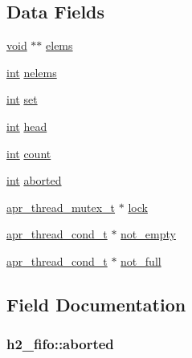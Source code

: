 \subsection*{Data Fields}
\begin{DoxyCompactItemize}
\item 
\hyperlink{group__MOD__ISAPI_gacd6cdbf73df3d9eed42fa493d9b621a6}{void} $\ast$$\ast$ \hyperlink{structh2__fifo_acc4bdceeab41c47735c7fa63b454cf70}{elems}
\item 
\hyperlink{pcre_8txt_a42dfa4ff673c82d8efe7144098fbc198}{int} \hyperlink{structh2__fifo_aad0836dd046d88fa564a96cd351178a0}{nelems}
\item 
\hyperlink{pcre_8txt_a42dfa4ff673c82d8efe7144098fbc198}{int} \hyperlink{structh2__fifo_a465006ad1ba0ecab8f76cc20bac1d2e5}{set}
\item 
\hyperlink{pcre_8txt_a42dfa4ff673c82d8efe7144098fbc198}{int} \hyperlink{structh2__fifo_abaf710a85bfcfc442d733044ec93c002}{head}
\item 
\hyperlink{pcre_8txt_a42dfa4ff673c82d8efe7144098fbc198}{int} \hyperlink{structh2__fifo_a7c503d09143b00a776ce22ddc2899419}{count}
\item 
\hyperlink{pcre_8txt_a42dfa4ff673c82d8efe7144098fbc198}{int} \hyperlink{structh2__fifo_a3d03a4fd2654db1d3da1cea3d711e381}{aborted}
\item 
\hyperlink{structapr__thread__mutex__t}{apr\+\_\+thread\+\_\+mutex\+\_\+t} $\ast$ \hyperlink{structh2__fifo_a759203ede022cdcd60da89e7d49eb89b}{lock}
\item 
\hyperlink{structapr__thread__cond__t}{apr\+\_\+thread\+\_\+cond\+\_\+t} $\ast$ \hyperlink{structh2__fifo_a5d00e617dd13e9873acc3f8460091e8e}{not\+\_\+empty}
\item 
\hyperlink{structapr__thread__cond__t}{apr\+\_\+thread\+\_\+cond\+\_\+t} $\ast$ \hyperlink{structh2__fifo_ae3a7e0e9693da10035a490e25c3da966}{not\+\_\+full}
\end{DoxyCompactItemize}


\subsection{Field Documentation}
\subsubsection[{\texorpdfstring{aborted}{aborted}}]{ h2\+\_\+fifo\+::aborted}\hypertarget{structh2__fifo_a3d03a4fd2654db1d3da1cea3d711e381}{}\label{structh2__fifo_a3d03a4fd2654db1d3da1cea3d711e381}
